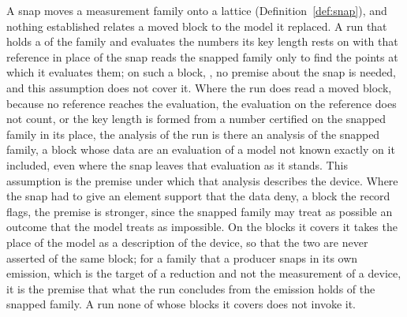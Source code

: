 A snap moves a measurement family onto a lattice
(Definition~\ref{def:snap}), and nothing established relates a moved block
to the model it replaced. A run that holds a  of the family
and evaluates the numbers its key length rests on with that reference in
place of the snap reads the snapped family only to find the points at which
it evaluates them; on such a block, , no premise
about the snap is needed, and this assumption does not cover it. Where the
run does read a moved block, because no reference reaches the evaluation, the
evaluation on the reference does not count, or the key length is formed from
a number certified on the snapped family in its place, the analysis of the
run is
there an analysis of the snapped family, a block whose data are an evaluation
of a model not known exactly on it included, even where the snap leaves that
evaluation as it stands. This assumption is the premise under which that
analysis describes the device. Where the snap had to give an element support
that the data deny, a block the record flags, the premise is stronger, since
the snapped family may treat as possible an outcome that the model treats as
impossible. On the blocks it covers it takes the place of the model as a
description of the device, so that the two are never asserted of the same
block; for a family that a producer snaps in its own emission, which is the
target of a reduction and not the measurement of a device, it is the premise
that what the run concludes from the emission holds of the snapped family. A
run none of whose blocks it covers does not invoke it.

